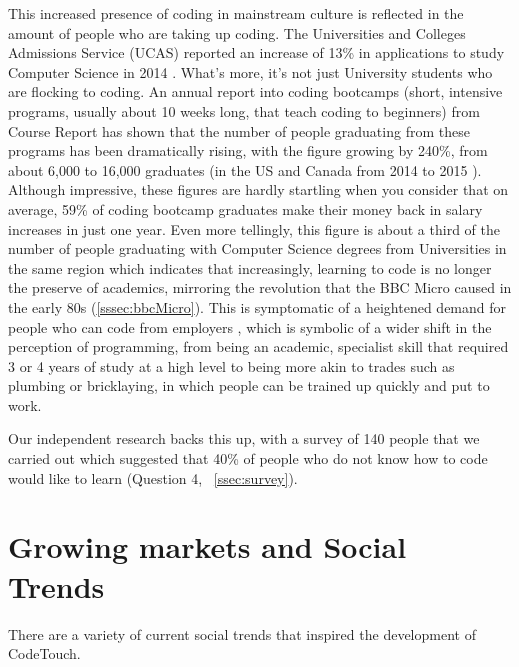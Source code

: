 \documentclass[ %
                    author={Jonathan Rankin},
                supervisor={Dr. David May, Dr. Ian Holyer},
                    degree={MEng},
                     title={CodeTouch},
                  subtitle={A Revolutionary Way To Program Real Code On Touch Screen Devices},
                      type={enterprise},
                      year={2015 } ]{dissertation}
\begin{document}
This increased presence of coding in mainstream culture is reflected in the amount of people who are taking up coding. The Universities and Colleges Admissions Service (UCAS) reported an increase of 13\% in applications to study Computer Science in 2014 \cite{computerWeekly}. What's more, it's not just University students who are flocking to coding. An annual report into coding bootcamps (short, intensive programs, usually about 10 weeks long, that teach coding to beginners) from Course Report has shown that the number of people graduating from these programs has been dramatically rising, with the figure growing by 240\%, from about 6,000 to 16,000 graduates (in the US and Canada from 2014 to 2015 \cite{coursereport}). Although impressive, these figures are hardly startling when you consider that on average, 59\% of coding bootcamp graduates make their money back in salary increases in just one year\cite{switchUp}. Even more tellingly, this figure is about a third of the number of people graduating with Computer Science degrees from Universities in the same region \cite{coursereport} which indicates that increasingly, learning to code is no longer the preserve of academics, mirroring the revolution that the BBC Micro caused in the early 80s (\ref{sssec:bbcMicro}). This is symptomatic of a heightened demand for people who can code from employers \cite{22percent}, which is symbolic of a wider shift in the perception of programming, from being an academic, specialist skill that required 3 or 4 years of study at a high level to being more akin to trades such as plumbing or bricklaying, in which people can be trained up quickly and put to work. 

Our independent research backs this up, with a survey of 140 people that we carried out which suggested that 40\% of people who do not know how to code would like to learn (Question 4, ~\ref{ssec:survey}). 


\section{Growing markets and Social Trends}
There are a variety of current social trends that inspired the development of CodeTouch.
\end{document}

